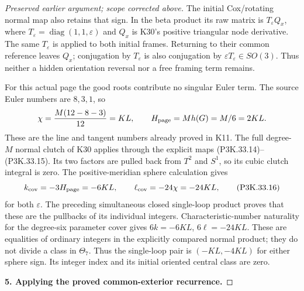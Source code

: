 \begin{proof}[Preserved earlier argument; scope corrected above]
The initial Cox/rotating normal map also retains that sign.
In the beta product its raw matrix is
\(T_\varepsilon Q_x\), where
\(T_\varepsilon=\operatorname{diag}(1,1,\varepsilon)\) and
\(Q_x\) is K30's positive triangular node derivative. The same
\(T_\varepsilon\) is applied to both initial frames. Returning
to their common reference leaves \(Q_x\); conjugation by
\(T_\varepsilon\) is also conjugation by
\(\varepsilon T_\varepsilon\in SO(3)\). Thus neither a hidden
orientation reversal nor a free framing term remains.

For this actual page the good roots contribute no singular Euler
term. The source Euler numbers are \(8,3,1\), so
\[
       \chi=\frac{M(12-8-3)}{12}=KL,
       \qquad H_{\rm page}=M h(G)=M/6=2KL.
\]
These are the line and tangent numbers already proved in K11.
The full degree-\(M\) normal clutch of K30 applies through
the explicit maps (P3K.33.14)--(P3K.33.15). Its two factors are pulled
back from \(T^2\) and \(S^1\), so its cubic clutch integral
is zero. The positive-meridian sphere calculation gives
\[
              k_{\rm cov}=-3H_{\rm page}=-6KL,
              \qquad \ell_{\rm cov}=-24\chi=-24KL,
                                                               \tag{P3K.33.16}
\]
for both \(\varepsilon\). The preceding simultaneous closed
single-loop product proves that these are the pullbacks of its
individual integers. Characteristic-number naturality for the
degree-six parameter cover gives
\(6k=-6KL\), \(6\ell=-24KL\). These are equalities of
ordinary integers in the explicitly compared normal product;
they do not divide a class in \(\Theta_7\). Thus the single-loop
pair is \((-KL,-4KL)\) for either sphere sign. Its integer
index and its initial oriented central class are zero.

\par\medskip\noindent\textbf{5. Applying the proved common-exterior recurrence.}\enspace


\end{proof}
